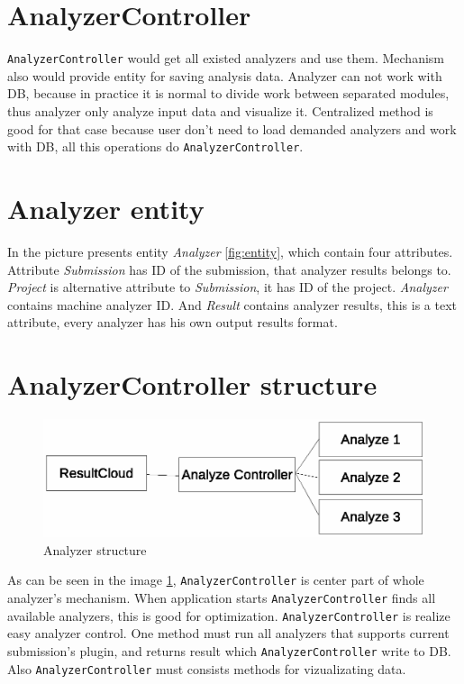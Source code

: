 \section{AnalyzerController}

\texttt{AnalyzerController} would get all existed analyzers and use them. Mechanism also would provide entity for saving analysis data. Analyzer can not work with DB, because in practice it is normal to divide work between separated modules, thus analyzer only analyze input data and visualize it. Centralized method is good for that case because user don't need to load demanded analyzers and work with DB, all this operations do \texttt{AnalyzerController}.

\section{Analyzer entity}

In the picture presents entity \emph{Analyzer} \ref{fig:entity}, which contain four attributes. Attribute \emph{Submission} has ID of the submission, that analyzer results belongs to. \emph{Project} is alternative attribute to \emph{Submission}, it has ID of the project. \emph{Analyzer} contains machine analyzer ID. And \emph{Result} contains analyzer results, this is a text attribute, every analyzer has his own output results format.

\section{AnalyzerController structure}

\begin{figure}
  \centering
    \includegraphics[trim=0 22cm 0 0,scale=0.8]{fig/analyzer-struct.eps}
  \caption{Analyzer structure}
  \label{fig:an_struct}
\end{figure}

As can be seen in the image \ref{fig:an_struct}, \texttt{AnalyzerController} is center part of whole analyzer's mechanism. When application starts \texttt{AnalyzerController} finds all available analyzers, this is good for optimization. \texttt{AnalyzerController} is realize easy analyzer control. One method must run all analyzers that supports current submission's plugin, and returns result which \texttt{AnalyzerController} write to DB. Also \texttt{AnalyzerController} must consists methods for vizualizating data.

